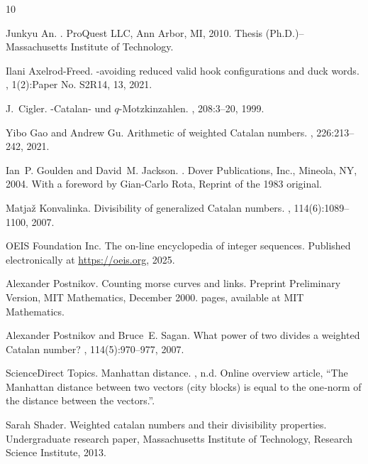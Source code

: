 \documentclass[12pt,notitlepage]{amsart}
\numberwithin{equation}{section}
\theoremstyle{thmstyleone}%
\theoremstyle{thmstyletwo}%
\theoremstyle{thmstylethree}%
\numberwithin{theorem}{section}
\numberwithin{equation}{section}
\begin{document}

\begin{thebibliography}{10}

Junkyu An.
.
\newblock ProQuest LLC, Ann Arbor, MI, 2010.
\newblock Thesis (Ph.D.)--Massachusetts Institute of Technology.

Ilani Axelrod-Freed.
-avoiding reduced valid hook configurations and duck words.
, 1(2):Paper No. S2R14, 13, 2021.

J.~Cigler.
-{C}atalan- und {$q$}-{M}otzkinzahlen.
, 208:3--20, 1999.

Yibo Gao and Andrew Gu.
\newblock Arithmetic of weighted {C}atalan numbers.
, 226:213--242, 2021.

Ian~P. Goulden and David~M. Jackson.
.
\newblock Dover Publications, Inc., Mineola, NY, 2004.
\newblock With a foreword by Gian-Carlo Rota, Reprint of the 1983 original.

Matja{\v{z}} Konvalinka.
\newblock Divisibility of generalized {Catalan} numbers.
, 114(6):1089--1100, 2007.

{OEIS Foundation Inc.}
\newblock The on-line encyclopedia of integer sequences.
\newblock Published electronically at \url{https://oeis.org}, 2025.

Alexander Postnikov.
\newblock Counting morse curves and links.
\newblock Preprint Preliminary Version, MIT Mathematics, December 2000.
 pages, available at MIT Mathematics.

Alexander Postnikov and Bruce~E. Sagan.
\newblock What power of two divides a weighted {Catalan} number?
, 114(5):970--977, 2007.

{ScienceDirect Topics}.
\newblock Manhattan distance.
, n.d.
\newblock Online overview article, “The Manhattan distance between two vectors (city blocks) is equal to the one‑norm of the distance between the vectors.”.

Sarah Shader.
\newblock Weighted catalan numbers and their divisibility properties.
\newblock Undergraduate research paper, Massachusetts Institute of Technology, Research Science Institute, 2013.


\end{thebibliography}
\end{document}
